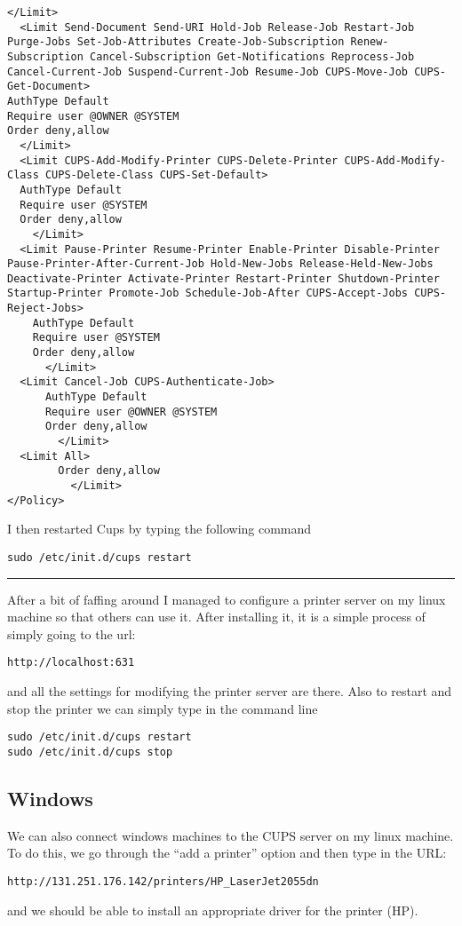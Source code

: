 \documentclass[a4paper, 10pt]{article}
\newcommand{\mybotrule}{\vspace{4mm}\hrule}
\begin{document}
\begin{verbatim}
</Limit>
  <Limit Send-Document Send-URI Hold-Job Release-Job Restart-Job Purge-Jobs Set-Job-Attributes Create-Job-Subscription Renew-Subscription Cancel-Subscription Get-Notifications Reprocess-Job Cancel-Current-Job Suspend-Current-Job Resume-Job CUPS-Move-Job CUPS-Get-Document>
AuthType Default
Require user @OWNER @SYSTEM
Order deny,allow
  </Limit>
  <Limit CUPS-Add-Modify-Printer CUPS-Delete-Printer CUPS-Add-Modify-Class CUPS-Delete-Class CUPS-Set-Default>
  AuthType Default
  Require user @SYSTEM
  Order deny,allow
    </Limit>
  <Limit Pause-Printer Resume-Printer Enable-Printer Disable-Printer Pause-Printer-After-Current-Job Hold-New-Jobs Release-Held-New-Jobs Deactivate-Printer Activate-Printer Restart-Printer Shutdown-Printer Startup-Printer Promote-Job Schedule-Job-After CUPS-Accept-Jobs CUPS-Reject-Jobs>
    AuthType Default
    Require user @SYSTEM
    Order deny,allow
      </Limit>
  <Limit Cancel-Job CUPS-Authenticate-Job>
      AuthType Default
      Require user @OWNER @SYSTEM
      Order deny,allow
        </Limit>
  <Limit All>
        Order deny,allow
          </Limit>
</Policy>
\end{verbatim}

I then restarted Cups by typing the following command
\begin{verbatim}
sudo /etc/init.d/cups restart
\end{verbatim}

\mybotrule

After a bit of faffing around I managed to configure a printer server on my linux machine so that others can use it. After installing it, it is a simple process of simply going to the url:
\begin{verbatim}
http://localhost:631
\end{verbatim}
and all the settings for modifying the printer server are there. Also to restart and stop the printer we can simply type in the command line
\begin{verbatim}
sudo /etc/init.d/cups restart
sudo /etc/init.d/cups stop
\end{verbatim}

\subsection*{Windows}
We can also connect windows machines to the CUPS server on my linux machine. To do this, we go through the ``add a printer'' option and then type in the URL:
\begin{verbatim}
http://131.251.176.142/printers/HP_LaserJet2055dn
\end{verbatim}
and we should be able to install an appropriate driver for the printer (HP).
%
\end{document}
